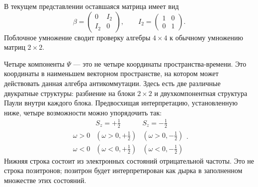 \begin{classroomqa}
\end{classroomqa}

В текущем представлении оставшаяся матрица имеет вид
\begin{equation}
\beta=
\begin{pmatrix}
0&I_2\\
I_2&0
\end{pmatrix},
\qquad
I_2=
\begin{pmatrix}
1&0\\
0&1
\end{pmatrix}.
\end{equation}
Поблочное умножение сводит проверку алгебры \(4\times4\) к обычному умножению матриц \(2\times2\).

\begin{classroomqa}
\end{classroomqa}

Четыре компоненты \(\Psi\) — это не четыре координаты пространства-времени. Это координаты в наименьшем векторном пространстве, на котором может действовать данная алгебра антикоммутации. Здесь есть две различные двукратные структуры: разбиение на блоки \(2\times2\) и двухкомпонентная структура Паули внутри каждого блока. Предвосхищая интерпретацию, установленную ниже, четыре возможности можно упорядочить так:
\begin{equation}
\begin{array}{c|cc}
& S_z=+\tfrac12 & S_z=-\tfrac12\\ \hline
\omega>0 & (\omega>0,+\tfrac12) & (\omega>0,-\tfrac12)\\
\omega<0 & (\omega<0,+\tfrac12) & (\omega<0,-\tfrac12)
\end{array}.
\end{equation}
Нижняя строка состоит из электронных состояний отрицательной частоты. Это не строка позитронов; позитрон будет интерпретирован как дырка в заполненном множестве этих состояний.

